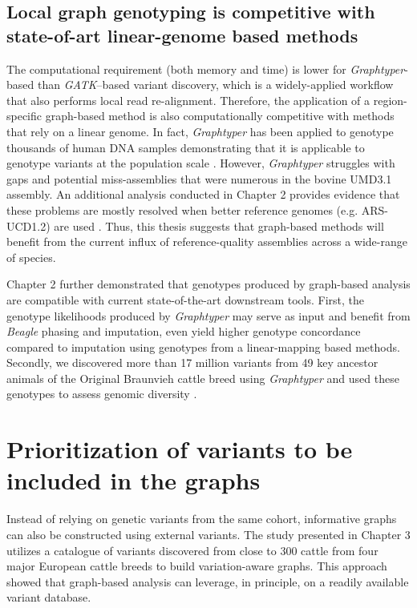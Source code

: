\documentclass[../main.tex]{subfiles}
\begin{document}
\subsection*{Local graph genotyping is competitive with state-of-art linear-genome based methods}

The computational requirement (both memory and time) is lower for \emph{Graphtyper}-based than \emph{GATK}–based variant discovery, which is a widely-applied workflow that also performs local read re-alignment. Therefore, the application of a region-specific graph-based method is also computationally competitive with methods that rely on a linear genome. In fact, \emph{Graphtyper} has been applied to genotype thousands of human DNA samples demonstrating that it is applicable to genotype variants at the population scale \citep{eggertsson2017graphtyper,eggertsson2019graphtyper2}. However, \emph{Graphtyper} struggles with gaps and potential miss-assemblies that were numerous in the bovine UMD3.1 assembly. An additional analysis conducted in Chapter 2 provides evidence that these problems are mostly resolved when better reference genomes (e.g. ARS-UCD1.2) are used \citep{rosen2020novo}. Thus, this thesis suggests that graph-based methods will benefit from the current influx of reference-quality assemblies across a wide-range of species. 

Chapter 2 further demonstrated that genotypes produced by graph-based analysis are compatible with current state-of-the-art downstream tools. First, the genotype likelihoods produced by \emph{Graphtyper }may serve as input and benefit from \emph{Beagle} phasing and imputation, even yield higher genotype concordance compared to imputation using genotypes from a linear-mapping based methods. Secondly, we discovered more than 17 million variants from 49 key ancestor animals of the Original Braunvieh cattle breed using \emph{Graphtyper} and used these genotypes to assess genomic diversity \citep{bhati2020assessing}. 

\section{Prioritization of variants to be included in the graphs}

Instead of relying on genetic variants from the same cohort, informative graphs can also be constructed using external variants. The study presented in Chapter 3 utilizes a catalogue of variants discovered from close to 300 cattle from four major European cattle breeds to build variation-aware graphs. This approach showed that graph-based analysis can leverage, in principle, on a readily available variant database. 
\end{document}
